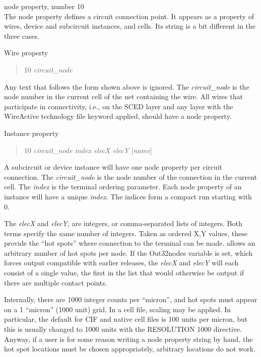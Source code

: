 \begin{description}
\item{\et node} property, number 10\\
The {\et node} property defines a circuit connection point.  It
appears as a property of wires, device and subcircuit instances, and
cells.  Its string is a bit different in the three cases.

Wire property\\
\begin{quote}{ 10} {\it circuit\_node}
\end{quote}

Any text that follows the form shown above is ignored.  The {\it
circuit\_node} is the node number in the current cell of the net
containing the wire.  All wires that participate in connectivity,
i.e., on the {\vt SCED} layer and any layer with the {\vt WireActive}
technology file keyword applied, should have a {\et node} property.

Instance property\\
\begin{quote}{ 10} {\it circuit\_node index elecX  elecY\/} [{\it name\/}]
\end{quote}

A subcircuit or device instance will have one {\et node} property per
circuit connection.  The {\it circuit\_node} is the node number of the
connection in the current cell.  The {\it index} is the terminal
ordering parameter.  Each {\et node} property of an instance will have
a unique {\it index\/}.  The indices form a compact run starting with
0.

The {\it elecX} and {\it elecY}, are integers, or comma-separated
lists of integers.  Both terms specify the same number of integers. 
Taken as ordered X,Y values, these provide the ``hot spots'' where
connection to the terminal can be made.  {\Xic} allows an arbitrary
number of hot spots per node.  If the {\et Out32nodes} variable is
set, which forces output compatible with earlier {\Xic} releases, the
{\it elecX} and {\it elecY} will each consist of a single value, the
first in the list that would otherwise be output if there are multiple
contact points.

Internally, there are 1000 integer counts per ``micron'', and hot
spots must appear on a 1 ``micron'' (1000 unit) grid.  In a cell file,
scaling may be applied.  In particular, the default for CIF and native
cell files is 100 units per micron, but this is usually changed to
1000 units with the {\vt RESOLUTION 1000} directive.  Anyway, if a
user is for some reason writing a node property string by hand, the
hot spot locations must be chosen appropriately, arbitrary locations
do not work.


\end{description}
